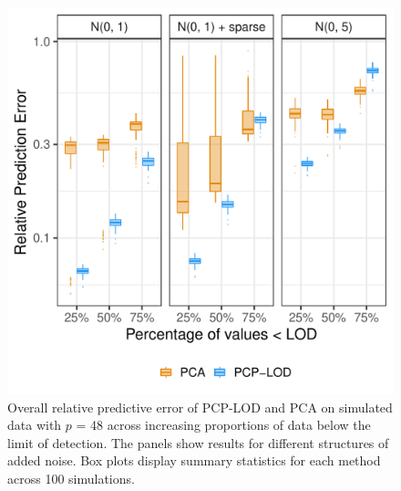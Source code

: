 {\begin{figure}
    \centering
\includegraphics[width=.85\textwidth]{figures/sim_boxplots_48.pdf}
   \caption[Overall relative error of PCP-LOD and PCA ($p$ = 48)]{Overall relative predictive error of PCP-LOD and PCA on simulated data with $p$ = 48 across increasing proportions of data below the limit of detection. The panels show results for different structures of added noise. Box plots display summary statistics for each method across 100 simulations.}
    \label{fig:overall_48}
\end{figure}


}

